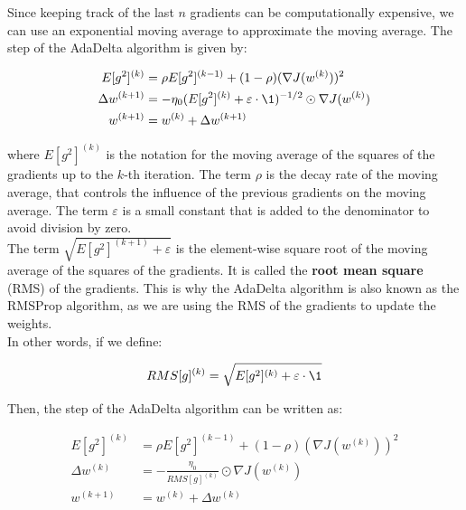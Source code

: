 Since keeping track of the last $n$ gradients can be computationally expensive, we can use an
exponential moving average to approximate the moving average. The step of the AdaDelta algorithm
is given by:

\begin{equation}
    \begin{aligned}
        E[g^2]^{(k)} &= \rho E[g^2]^{(k-1)} + (1 - \rho) (\nabla J(w^{(k)}))^2 \\
        \Delta w^{(k+1)} &= - \eta_0 (E[g^2]^{(k)} + \varepsilon \cdot \1)^{-1/2} \odot \nabla J(w^{(k)}) \\
        w^{(k+1)} &= w^{(k)} + \Delta w^{(k+1)}
    \end{aligned}
\end{equation}

where $E[g^2]^{(k)}$ is the notation for the moving average of the squares of the gradients up to
the $k$-th iteration. The term $\rho$ is the decay rate of the moving average, that controls the
influence of the previous gradients on the moving average. The term $\varepsilon$ is a small constant
that is added to the denominator to avoid division by zero.\\

The term $\sqrt{E[g^2]^{(k+1)} + \varepsilon}$ is the element-wise square root of the moving average
of the squares of the gradients. It is called the \textbf{root mean square} (RMS) of the gradients. This
is why the AdaDelta algorithm is also known as the RMSProp algorithm, as we are using the RMS of the
gradients to update the weights.\\

In other words, if we define:

\begin{equation}
    RMS[g]^{(k)} = \sqrt{E[g^2]^{(k)} + \varepsilon \cdot \1}
\end{equation}

Then, the step of the AdaDelta algorithm can be written as:

\begin{equation}
    \begin{aligned}
        E[g^2]^{(k)} &= \rho E[g^2]^{(k-1)} + (1 - \rho) (\nabla J(w^{(k)}))^2 \\
        \Delta w^{(k)} &= - \frac{\eta_0}{RMS[g]^{(k)}} \odot \nabla J(w^{(k)})\\
        w^{(k+1)} &= w^{(k)} + \Delta w^{(k)}
    \end{aligned}
\end{equation}

